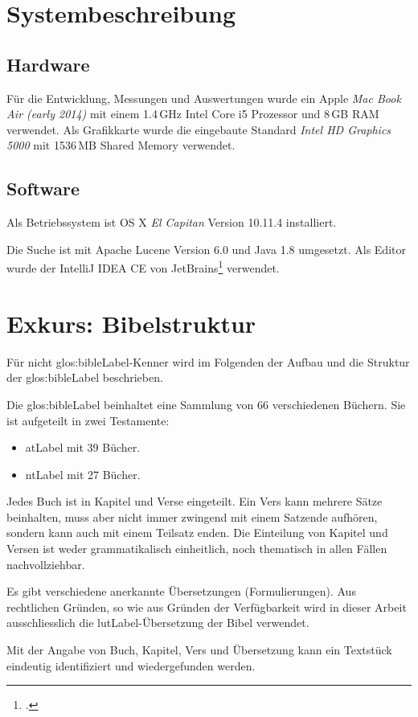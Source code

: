 \section{Systembeschreibung}
\subsection{Hardware}
Für die Entwicklung, Messungen und Auswertungen wurde ein Apple \textit{Mac Book Air (early 2014)} mit einem 1.4\,GHz Intel Core i5 Prozessor und 8\,GB RAM verwendet. Als Grafikkarte wurde die eingebaute Standard \textit{Intel HD Graphics 5000} mit 1536\,MB Shared Memory verwendet.

\subsection{Software}
Als Betriebssystem ist OS X \textit{El Capitan} Version 10.11.4  installiert.

Die Suche ist mit Apache Lucene Version 6.0 und Java 1.8 umgesetzt. Als Editor wurde der IntelliJ IDEA CE von JetBrains\footcite{IntelliJ_IDEA_the_Java_IDE_2016-05-09} verwendet.

\section{Exkurs: Bibelstruktur}
Für nicht \gls{glos:bibleLabel}-Kenner wird im Folgenden der Aufbau und die Struktur der \gls{glos:bibleLabel} beschrieben.

Die \gls{glos:bibleLabel} beinhaltet eine Sammlung von 66 verschiedenen Büchern.
Sie ist aufgeteilt in zwei Testamente:
\begin{itemize}
	\item \gls{atLabel} mit 39 Bücher.
	\item \gls{ntLabel} mit 27 Bücher.
\end{itemize}
Jedes Buch ist in Kapitel und Verse eingeteilt. Ein Vers kann mehrere Sätze beinhalten, muss aber nicht immer zwingend mit einem Satzende aufhören, sondern kann auch mit einem Teilsatz enden.
Die Einteilung von Kapitel und Versen ist weder grammatikalisch einheitlich, noch thematisch in allen Fällen nachvollziehbar.

Es gibt verschiedene anerkannte Übersetzungen (Formulierungen).
Aus rechtlichen Gründen, so wie aus Gründen der Verfügbarkeit wird in dieser Arbeit ausschliesslich die \gls{lutLabel}-Übersetzung der Bibel verwendet.

Mit der Angabe von Buch, Kapitel, Vers und Übersetzung kann ein Textstück eindeutig identifiziert und wiedergefunden werden.


